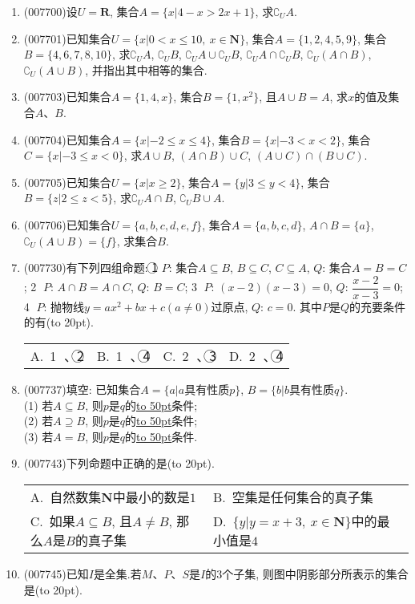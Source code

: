 \documentclass[10pt,a4paper]{article}
\newcommand{\blank}[1]{\underline{\hbox to #1pt{}}}
\newcommand{\bracket}[1]{(\hbox to #1pt{})}
\newcommand{\twoch}[4]{\par\begin{tabular}{p{.46\textwidth}p{.46\textwidth}}
A.~#1& B.~#2\\
C.~#3& D.~#4
\end{tabular}}
\newcommand{\fourch}[4]{\par\begin{tabular}{p{.23\textwidth}p{.23\textwidth}p{.23\textwidth}p{.23\textwidth}}
A.~#1 &B.~#2& C.~#3& D.~#4
\end{tabular}}
\begin{document}
\begin{enumerate}[1.]
\item {\tiny (007700)}设$U=\mathbf{R}$, 集合$A=\{x|4-x>2x+1\}$, 求$\complement _UA$.
\item {\tiny (007701)}已知集合$U=\{x|0<x\le 10, \ x\in \mathbf{N}\}$, 集合$A=\{1,2,4,5,9\}$, 集合$B=\{4,6,7,8,10\}$, 求$\complement _UA$, $\complement _UB$, $\complement _UA\cup \complement _UB$, $\complement _UA\cap \complement _UB$, $\complement _U(A\cap B)$, $\complement _U(A\cup B)$, 并指出其中相等的集合.
\item {\tiny (007703)}已知集合$A=\{1,4,x\}$, 集合$B=\{1,x^2\}$, 且$A\cup B=A$, 求$x$的值及集合$A$、$B$.
\item {\tiny (007704)}已知集合$A=\{x|-2\le x\le 4\}$, 集合$B=\{x|-3<x<2\}$, 集合$C=\{x|-3\le x<0\}$, 求$A\cup B$, $(A\cap B)\cup C$, $(A\cup C)\cap (B\cup C)$.
\item {\tiny (007705)}已知集合$U=\{x|x\ge 2\}$, 集合$A=\{y|3\le y<4\}$, 集合$B=\{z|2\le z<5\}$, 求$\complement _UA\cap B$, $\complement _UB\cup A$.
\item {\tiny (007706)}已知集合$U=\{a,b,c,d,e,f\}$, 集合$A=\{a,b,c,d\}$, $A\cap B=\{a\}$, $\complement _U(A\cup B)=\{f\}$, 求集合$B$.
\item {\tiny (007730)}有下列四组命题:
\textcircled{1} $P$: 集合$A\subseteq B$, $B\subseteq C$, $C\subseteq A$, 		$Q$: 集合$A=B=C$;
\textcircled{2} $P$: $A\cap B=A\cap C$, 					$Q$: $B=C$;
\textcircled{3} $P$: $(x-2)(x-3)=0$, 				$Q$: $\dfrac{x-2}{x-3}=0$;
\textcircled{4} $P$: 抛物线$y=ax^2+bx+c(a\ne 0)$过原点, $Q$: $c=0$.
其中$P$是$Q$的充要条件的有\bracket{20}.
\fourch{\textcircled{1} 、\textcircled{2} }{\textcircled{1} 、\textcircled{4} }{\textcircled{2} 、\textcircled{3} }{\textcircled{2} 、\textcircled{4}}
\item {\tiny (007737)}填空:
已知集合$A=\{a|a$具有性质$p\}$, $B=\{b|b$具有性质$q\}$.\\
(1) 若$A\subseteq B$, 则$p$是$q$的\blank{50}条件;\\
(2) 若$A\supseteq B$, 则$p$是$q$的\blank{50}条件;\\
(3) 若$A=B$, 则$p$是$q$的\blank{50}条件.
\item {\tiny (007743)}下列命题中正确的是\bracket{20}.
\twoch{自然数集$\mathbf{N}$中最小的数是$1$}{空集是任何集合的真子集}{如果$A\subseteq B$, 且$A\ne B$, 那么$A$是$B$的真子集}{$\{y|y=x+3,\ x\in \mathbf{N}\}$中的最小值是$4$}
\item {\tiny (007745)}已知$I$是全集.若$M$、$P$、$S$是$I$的$3$个子集, 则图中阴影部分所表示的集合是\bracket{20}.
\begin{center}
    \begin{tikzpicture}

\end{tikzpicture}
\end{center}
\end{enumerate}
\end{document}
